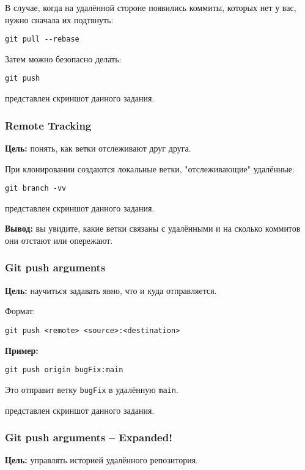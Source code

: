 \documentclass[a4paper,12pt]{report}
\begin{document}
В случае, когда на удалённой стороне появились коммиты, которых нет у вас, нужно сначала их подтянуть:
\begin{verbatim}
git pull --rebase
\end{verbatim}

Затем можно безопасно делать:
\begin{verbatim}
git push
\end{verbatim}

 представлен скриншот данного задания.

\subsubsection{Remote Tracking}
\textbf{Цель:} понять, как ветки отслеживают друг друга.

При клонировании создаются локальные ветки, "отслеживающие" удалённые:
\begin{verbatim}
git branch -vv
\end{verbatim}

 представлен скриншот данного задания.

\textbf{Вывод:} вы увидите, какие ветки связаны с удалёнными и на сколько коммитов они отстают или опережают.

\subsubsection{Git push arguments}
\textbf{Цель:} научиться задавать явно, что и куда отправляется.

Формат:
\begin{verbatim}
git push <remote> <source>:<destination>
\end{verbatim}

\textbf{Пример:}
\begin{verbatim}
git push origin bugFix:main
\end{verbatim}

Это отправит ветку \texttt{bugFix} в удалённую \texttt{main}.

 представлен скриншот данного задания.

\subsubsection{Git push arguments -- Expanded!}
\textbf{Цель:} управлять историей удалённого репозитория.
\end{document}
